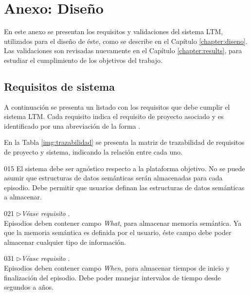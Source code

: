 \chapter{Anexo: Diseño}\label{chapter:appendix_a}

En este anexo se presentan los requisitos y validaciones del sistema LTM, utilizados para el diseño de éste, como se describe en el Capítulo  \ref{chapter:diseno}. Las validaciones son revisadas nuevamente en el Capítulo \ref{chapter:results}, para estudiar el cumplimiento de los objetivos del trabajo. 

\section{Requisitos de sistema}\label{appendix:req-sistema}

A continuación se presenta un listado con los requisitos que debe cumplir el sistema LTM. Cada requisito indica el requisito de proyecto asociado y es identificado por una abreviación de la forma .

En la Tabla \ref{img:trazabilidad} se presenta la matriz de trazabilidad de requisitos de proyecto y sistema, indicando la relación entre cada uno.

\newenvironment{requisito-sistema}[2]
{
	\noindent{\bfseries Requisito \RSlabel{#1}}
	\hfill\textit{(Derivado de }\RPlabel{#2})\\
}{}
\newcommand{\RSlinkStachowicz}[1]{$\triangleright$\textit{Véase requisito }\RStachowicz{#1}.\\}

\begin{requisito-sistema}{01}{5}
	El sistema debe ser agnóstico respecto a la plataforma objetivo. No se puede asumir que estructuras de datos semánticas serán almacenadas para cada episodio. Debe permitir que usuarios definan las estructuras de datos semánticas a almacenar.
\end{requisito-sistema}

\begin{requisito-sistema}{02}{1}
	\RSlinkStachowicz{1}
	Episodios deben contener campo \textit{What}, para almacenar memoria semántica. Ya que la memoria semántica es definida por el usuario, éste campo debe poder almacenar cualquier tipo de información.	
\end{requisito-sistema}

\begin{requisito-sistema}{03}{1}
	\RSlinkStachowicz{1}
	Episodios deben contener campo \textit{When}, para almacenar tiempos de inicio y finalización del episodio. Debe poder manejar intervalos de tiempo desde segundos a años.	
\end{requisito-sistema}

